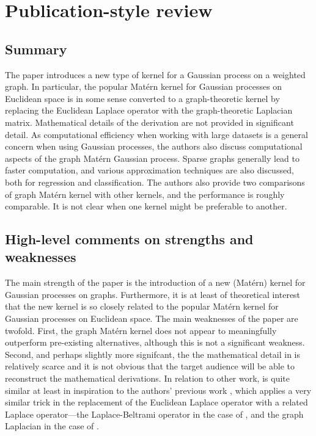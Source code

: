 

\section{Publication-style review}

\subsection{Summary}

The paper \cite{pmlr-v130-borovitskiy21a} introduces a new type of kernel for a Gaussian process on a weighted graph. In particular, the popular Mat\'{e}rn kernel for Gaussian processes on Euclidean space is in some sense converted to a graph-theoretic kernel by replacing the Euclidean Laplace operator with the graph-theoretic Laplacian matrix. Mathematical details of the derivation are not provided in significant detail. As computational efficiency when working with large datasets is a general concern when using Gaussian processes, the authors also discuss computational aspects of the graph Mat\'{e}rn Gaussian process. Sparse graphs generally lead to faster computation, and various approximation techniques are also discussed, both for regression and classification. The authors also provide two comparisons of graph Mat\'{e}rn kernel with other kernels, and the performance is roughly comparable. It is not clear when one kernel might be preferable to another.

\subsection{High-level comments on strengths and weaknesses}

The main strength of the paper is the introduction of a new (Mat\'{e}rn) kernel for Gaussian processes on graphs. Furthermore, it is at least of theoretical interest that the new kernel is so closely related to the popular Mat\'{e}rn kernel for Gaussian processes on Euclidean space. The main weaknesses of the paper are twofold. First, the graph Mat\'{e}rn kernel does not appear to meaningfully outperform pre-existing alternatives, although this is not a significant weakness. Second, and perhaps slightly more signifcant, the the mathematical detail in \cite{pmlr-v130-borovitskiy21a} is relatively scarce and it is not obvious that the target audience will be able to reconstruct the mathematical derivations. In relation to other work, \cite{pmlr-v130-borovitskiy21a} is quite similar at least in inspiration to the authors' previous work \cite{NEURIPS2020_92bf5e62}, which applies a very similar trick in the replacement of the Euclidean Laplace operator with a related Laplace operator---the Laplace-Beltrami operator in the case of \cite{NEURIPS2020_92bf5e62}, and the graph Laplacian in the case of \cite{pmlr-v130-borovitskiy21a}.

